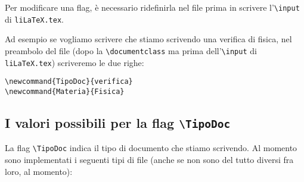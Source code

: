 \documentclass[italian, a4paper]{article}
\newcommand{\bs}{\textbackslash}
\newcommand{\ttt}[1]{\texttt{#1}}
\begin{document}
Per modificare una flag, è necessario ridefinirla nel file prima in scrivere l'\ttt{\bs input} di \ttt{liLaTeX.tex}.

Ad esempio se vogliamo scrivere che stiamo scrivendo una verifica di fisica, nel preambolo del file (dopo la \ttt{\bs documentclass} ma prima dell'\ttt{\bs input} di \ttt{liLaTeX.tex}) scriveremo le due righe:

\begin{center}
\ttt{\bs newcommand\{TipoDoc\}\{verifica\}}\\
\ttt{\bs newcommand\{Materia\}\{Fisica\}}
\end{center}

\subsection{I valori possibili per la flag \ttt{\bs TipoDoc}}
La flag \ttt{\bs TipoDoc} indica il tipo di documento che stiamo scrivendo. Al momento sono implementati i seguenti tipi di file (anche se non sono del tutto diversi fra loro, al momento):
\end{document}
